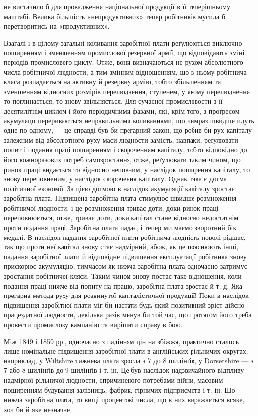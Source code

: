 \parcont{}  %
не вистачило б для провадження національної продукції в її
теперішньому маштабі. Велика більшість «непродуктивних»
тепер робітників мусила б перетворитись на «продуктивних».

Взагалі і в цілому загальні коливання заробітної плати реґулюються
виключно поширенням і зменшенням промислової резервної
армії, що відповідають зміні періодів промислового циклу.
Отже, вони визначаються не рухом абсолютного числа робітничої
людности, а тим змінним відношенням, що в ньому робітнича кляса
розпадається на активну й резервну армію, тобто збільшенням
та зменшенням відносних розмірів перелюднення, ступенем, у
якому перелюднення то поглинається, то знову звільняється.
Для сучасної промисловости з її десятилітнім циклом і його періодичними
фазами, які, крім того, з проґресом акумуляції перериваються
неправильними коливаннями, що чимраз швидше йдуть
одне по одному, — це справді був би прегарний закон, що робив
би рух капіталу залежним від абсолютного руху маси людности
замість, навпаки, реґулювати попит і подання праці поширенням
і скороченням капіталу, тобто відповідно до його кожноразових
потреб самозростання, отже, реґулювати таким чином,
що ринок праці видається то відносно неповним, у наслідок
поширення капіталу, то знову переповненим, у наслідок скорочення
капіталу. Однак така є догма політичної економії. За цією
догмою в наслідок акумуляції капіталу зростає заробітна плата.
Підвищена заробітна плата стимулює швидше розмноження робітничої
людности, і це розмноження триває доти, доки ринок
праці переповнюється, отже, триває доти, доки капітал стане
відносно недостатнім проти подання праці. Заробітна плата падає,
і тепер ми маємо зворотний бік медалі. В наслідок падання
заробітної плати робітнича людність поволі рідшає, так що проти
неї капітал знову стає надмірний, абож, як це пояснюють інші,
падання заробітної плати й відповідне підвищення експлуатації
робітника знову прискорює акумуляцію, тимчасом як нижча
заробітна плата одночасно затримує зростання робітничої кляси.
Таким чином знову постає таке відношення, коли подання праці
нижче від попиту на працю, заробітна плата зростає й т. д.
Яка прегарна метода руху для розвинутої капіталістичної продукції!
Поки в наслідок підвищення заробітної плати міг би
настати будь-який позитивний зріст дійсно працездатної людности,
декілька разів минув би той час, що протягом його треба
провести промислову кампанію та вирішити справу в бою.

Між 1849 і 1859 рр., одночасно з падінням цін на збіжжя,
практично сталось лише номінальне підвищення заробітної
плати в англійських рільничих округах: наприклад, у Wiltshire
тижнева плата зросла з 7 до 8 шилінґів, у Dorsetshire — з 7 або
8 шилінґів до 9 шилінґів і т. ін. Це був наслідок надзвичайного
відпливу надмірної рільничої людности, спричиненого потребами
війни, масовим поширенням будування залізниць, фабрик, гірничих
підприємств і т. ін. Що нижча заробітна плата, то вищі процентові
числа, що в них виражається всяке, хоч би й яке незначне
\parbreak{}  %
